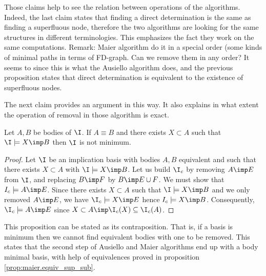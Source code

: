 Those claims help to see the relation between operations of the algorithms. 
Indeed, the last claim states that finding a direct determination is the same
as finding a superfluous node, therefore the two algorithms are looking for
the same structures in different terminologies. This emphasizes the fact they
work on the same computations. Remark: Maier algorithm do it in a special 
order (some kinds of minimal paths in terms of FD-graph. Can we remove them in 
any order? It seems to since this is what the Ausiello algorithm does, and
the previous proposition states that direct determination is equivalent to the
existence of superfluous nodes.

\vspace{1.2em}

The next claim provides an argument in this way. It also explains in what 
extent the operation of removal in those algorithm is exact.

\begin{proposition} Let $A, B$ be bodies of $\I$. If $A \equiv B$ and
there exists $X \subset A$ such that $\I \models X \imp B$ then $\I$ is not
minimum.
	
\end{proposition}

\begin{proof} Let $\I$ be an implication basis with bodies $A, B$ equivalent and
such that there exists $X \subset A$ with $\I \models X \imp B$. Let us build
$\I_c$ by removing $A \imp E$ from $\I$, and replacing $B \imp F$ by $B \imp
E \cup F$. We must show that $I_c \models A \imp E$. Since there exists $X 
\subset A$ such that $\I \models X \imp B$ and we only removed $A \imp E$, we
have $\I_c \models X \imp E$ hence $I_c \models X \imp B$. Consequently, 
$\I_c \models A \imp E$ since $X \subset A \imp \I_c(X) \subseteq \I_c(A)$.
\end{proof}

\vspace{1.2em}

This proposition can be stated as its contraposition. That is, if a basis is
minimum then we cannot find equivalent bodies with one to be removed. This 
states that the second step of Ausiello and Maier algorithms end up with a 
body minimal basis, with help of equivalences proved in proposition 
\ref{prop:maier.equiv_sup_sub}.

